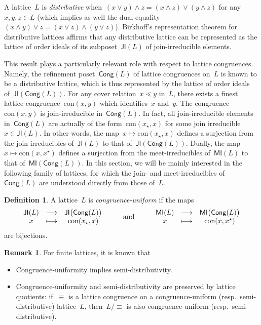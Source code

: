 \documentclass{amsart}
\theoremstyle{definition}
\newtheorem{definition}[theorem]{Definition}
\newtheorem{remark}[theorem]{Remark}
\newcommand{\darkblue}{\color{darkblue}} %
\newcommand{\defn}[1]{\textsl{\darkblue #1}} %
\newcommand{\meet}{\wedge} %
\newcommand{\join}{\vee} %
\newcommand{\JI}{\mathsf{JI}} %
\newcommand{\MI}{\mathsf{MI}} %
\newcommand{\Cong}{\mathsf{Cong}} %
\newcommand{\con}{\mathrm{con}} %
\begin{document}
A lattice~$L$ is \defn{distributive} when~$(x \join y) \meet z = (x \meet z) \join (y \meet z)$ for any~$x,y,z \in L$ (which implies as well the dual equality~$(x \meet y) \join z = (x \join z) \meet (y \join z)$).
Birkhoff's representation theorem for distributive lattices affirms that any distributive lattice can be represented as the lattice of order ideals of its subposet~$\JI(L)$ of join-irreducible elements.

This result plays a particularly relevant role with respect to lattice congruences.
Namely, the refinement poset~$\Cong(L)$ of lattice congruences on~$L$ is known to be a distributive lattice, which is thus represented by the lattice of order ideals of~$\JI(\Cong(L))$.
For any cover relation~$x \lessdot y$ in~$L$, there exists a finest lattice congruence~$\con(x,y)$ which identifies~$x$ and~$y$.
The congruence~$\con(x,y)$ is join-irreducible in~$\Cong(L)$.
In fact, all join-irreducible elements in~$\Cong(L)$ are actually of the form~$\con(x_\star,x)$ for some join irreducible~$x \in \JI(L)$.
In other words, the map~$x \mapsto \con(x_\star,x)$ defines a surjection from the join-irreducibles of~$\JI(L)$ to that of~$\JI(\Cong(L))$.
Dually, the map~${x \mapsto \con(x,x^\star)}$ defines a surjection from the meet-irreducibles of~$\MI(L)$ to that of~$\MI(\Cong(L))$.
In this section, we will be mainly interested in the following family of lattices, for which the join- and meet-irreducibles of~$\Cong(L)$ are understood directly from those of~$L$.

\begin{definition}
A lattice~$L$ is \defn{congruence-uniform} if the maps
\[
\begin{array}{ccccccc}
\JI(L) & \longrightarrow & \JI\big(\Cong(L)\big) &
\multirow{2}{*}{\qquad\text{and}\qquad} & 
\MI(L) & \longrightarrow & \MI\big(\Cong(L)\big) \\
x & \longmapsto & \con(x_\star,x) & & x & \longmapsto & \con(x,x^\star)
\end{array}
\]
are bijections.
\end{definition}

\begin{remark}
For finite lattices, it is known that 
\begin{itemize}
\item Congruence-uniformity implies semi-distributivity.
\item Congruence-uniformity and semi-distributivity are preserved by lattice quotients: if~$\equiv$ is a lattice congruence on a congruence-uniform (resp.~semi-distributive) lattice~$L$, then~$L/{\equiv}$ is also congruence-uniform (resp.~semi-distributive).
\end{itemize}
\end{remark}
\end{document}
